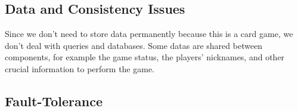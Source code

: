 \documentclass{scrartcl}
\begin{document}
\subsection{Data and Consistency
      Issues}\label{data-and-consistency-issues}

Since we don't need to store data permanently because this is a card game, we don't deal with queries and databases. \newline
Some datas are shared between components, for example the game status, the players' nicknames, and other crucial information to perform the game. \newline

\subsection{Fault-Tolerance}\label{fault-tolerance}


\end{document}
